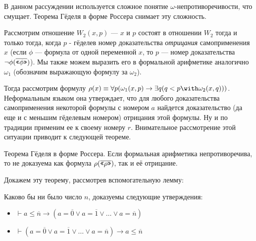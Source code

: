 В данном рассуждении используется сложное понятие
$\omega$-непротиворечивости, что смущает. Теорема Гёделя в форме 
Россера снимает эту сложность.

Рассмотрим отношение $W_2 (x,p)$ --- $x$ и $p$ состоят в отношении $W_2$ тогда и только тогда, когда
$p$ - гёделев номер доказательства \emph{отрицания} самоприменения $x$ (если $\phi$ --- формула от
одной переменной $x$, то $p$ --- номер доказательства $\neg \phi(\overline{\texttt{<<}\phi\texttt{>>}})$). 
Мы также можем выразить его в формальной арифметике аналогично $\omega_1$
(обозначим выражающую формулу за $\omega_2$).

Тогда рассмотрим формулу $\rho(x) \equiv \forall p (\omega_1 (x,p) \rightarrow \exists q (q < p \with \omega_2 (x,q)))$.
Неформальным языком она утверждает, что для любого доказательства самоприменения некоторой 
формулы с номером $a$ найдется доказательство (да еще и с меньшим гёделевым номером) 
отрицания этой формулы. Ну и по традиции применим ее к своему номеру $r$. 
Внимательное рассмотрение этой ситуации приводит к следующей теореме.

\begin{theorem}{Теорема Гёделя в форме Россера.}
Если формальная арифметика непротиворечива, то не доказуема как формула $\rho(\overline{\texttt{<<}\rho\texttt{>>}})$, так и её отрицание.
\end{theorem}

Докажем эту теорему, рассмотрев вспомогательную лемму:
\begin{lemma}
Каково бы ни было число $n$, доказуемы следующие утверждения:
\begin{itemize}
\item $\vdash a \le \overline{n} \rightarrow (a=\overline{0} \vee a=\overline{1} \vee \dots \vee a=\overline{n})$ 
\item $\vdash (a=\overline{0} \vee a=\overline{1} \vee \dots \vee a=\overline{n}) \rightarrow a\le\overline{n}$ 
\end{itemize}
\end{lemma}

